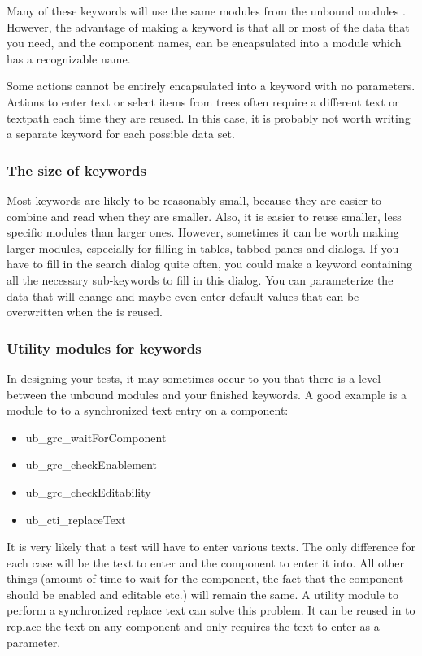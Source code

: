 Many of these keywords will use the same modules from the unbound modules \gdproject{}. However, the advantage of making a keyword is that all or most of the data that you need, and the component names, can be encapsulated into a module which has a recognizable name. 

Some actions cannot be entirely encapsulated into a keyword with no parameters. Actions to enter text or select items from trees often require a different text or textpath each time they are reused. In this case, it is probably not worth writing a separate keyword for each possible data set. 



\subsubsection{The size of keywords}
Most keywords are likely to be reasonably small, because they are easier to combine and read when they are smaller. Also, it is easier to reuse smaller, less specific modules than larger ones. However, sometimes it can be worth making larger modules, especially for filling in tables, tabbed panes and dialogs. If you have to fill in the search dialog quite often, you could make a keyword containing all the necessary sub-keywords to fill in this dialog. You can parameterize the data that will change and maybe even enter default values that can be overwritten when the \gdcase{} is reused. 

\subsubsection{Utility modules for keywords}
\label{BPKeywordsUtility}
In designing your tests, it may sometimes occur to you that there is a level between the unbound modules and your finished keywords. A good example is a module to to a synchronized text entry on a component:
\begin{itemize}
\item ub\_grc\_waitForComponent 
\item ub\_grc\_checkEnablement
\item ub\_grc\_checkEditability
\item ub\_cti\_replaceText
\end{itemize}

It is very likely that a test will have to enter various texts. The only difference for each case will be the text to enter and the component to enter it into. All other things (amount of time to wait for the component, the fact that the component should be enabled and editable etc.) will remain the same. A utility module to perform a synchronized replace text can solve this problem. It can be reused in \gdcases{} to replace the text on any component  and only requires the text to enter as a parameter. 

